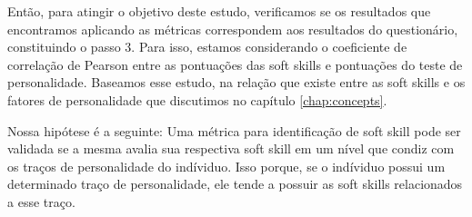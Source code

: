 Então, para atingir o objetivo deste estudo, verificamos se os resultados que encontramos aplicando as métricas correspondem aos resultados do questionário, constituindo o passo 3.
Para isso, estamos considerando o coeficiente de correlação de Pearson entre as pontuações das soft skills e pontuações do teste de personalidade.
Baseamos esse estudo, na relação que existe entre as soft skills e os fatores de personalidade que discutimos no capítulo \ref{chap:concepts}.

Nossa hipótese é a seguinte: Uma métrica para identificação de soft skill pode ser validada se a mesma avalia sua respectiva soft skill em um nível que condiz com os traços de personalidade do indíviduo. Isso porque, se o indíviduo possui um determinado traço de personalidade, ele tende a possuir as soft skills relacionados a esse traço.
